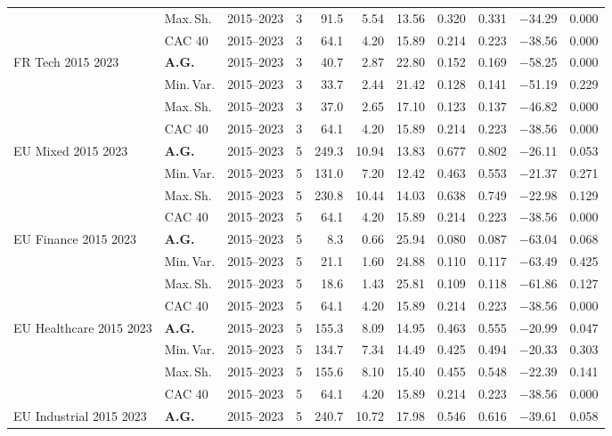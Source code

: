 \begin{longtable}{p{2.6cm} l c c r r r r r r r}
 & Max.\,Sh. & 2015--2023 & 3 & 91.5 & 5.54 & 13.56 & 0.320 & 0.331 & $-$34.29 & 0.000 \\
 & CAC 40 & 2015--2023 & 3 & 64.1 & 4.20 & 15.89 & 0.214 & 0.223 & $-$38.56 & 0.000 \\
\midrule
FR Tech 2015 2023 & \textbf{A.G.} & 2015--2023 & 3 & 40.7 & 2.87 & 22.80 & 0.152 & 0.169 & $-$58.25 & 0.000 \\
 & Min.\,Var. & 2015--2023 & 3 & 33.7 & 2.44 & 21.42 & 0.128 & 0.141 & $-$51.19 & 0.229 \\
 & Max.\,Sh. & 2015--2023 & 3 & 37.0 & 2.65 & 17.10 & 0.123 & 0.137 & $-$46.82 & 0.000 \\
 & CAC 40 & 2015--2023 & 3 & 64.1 & 4.20 & 15.89 & 0.214 & 0.223 & $-$38.56 & 0.000 \\
\midrule
EU Mixed 2015 2023 & \textbf{A.G.} & 2015--2023 & 5 & 249.3 & 10.94 & 13.83 & 0.677 & 0.802 & $-$26.11 & 0.053 \\
 & Min.\,Var. & 2015--2023 & 5 & 131.0 & 7.20 & 12.42 & 0.463 & 0.553 & $-$21.37 & 0.271 \\
 & Max.\,Sh. & 2015--2023 & 5 & 230.8 & 10.44 & 14.03 & 0.638 & 0.749 & $-$22.98 & 0.129 \\
 & CAC 40 & 2015--2023 & 5 & 64.1 & 4.20 & 15.89 & 0.214 & 0.223 & $-$38.56 & 0.000 \\
\midrule
EU Finance 2015 2023 & \textbf{A.G.} & 2015--2023 & 5 & 8.3 & 0.66 & 25.94 & 0.080 & 0.087 & $-$63.04 & 0.068 \\
 & Min.\,Var. & 2015--2023 & 5 & 21.1 & 1.60 & 24.88 & 0.110 & 0.117 & $-$63.49 & 0.425 \\
 & Max.\,Sh. & 2015--2023 & 5 & 18.6 & 1.43 & 25.81 & 0.109 & 0.118 & $-$61.86 & 0.127 \\
 & CAC 40 & 2015--2023 & 5 & 64.1 & 4.20 & 15.89 & 0.214 & 0.223 & $-$38.56 & 0.000 \\
\midrule
EU Healthcare 2015 2023 & \textbf{A.G.} & 2015--2023 & 5 & 155.3 & 8.09 & 14.95 & 0.463 & 0.555 & $-$20.99 & 0.047 \\
 & Min.\,Var. & 2015--2023 & 5 & 134.7 & 7.34 & 14.49 & 0.425 & 0.494 & $-$20.33 & 0.303 \\
 & Max.\,Sh. & 2015--2023 & 5 & 155.6 & 8.10 & 15.40 & 0.455 & 0.548 & $-$22.39 & 0.141 \\
 & CAC 40 & 2015--2023 & 5 & 64.1 & 4.20 & 15.89 & 0.214 & 0.223 & $-$38.56 & 0.000 \\
\midrule
EU Industrial 2015 2023 & \textbf{A.G.} & 2015--2023 & 5 & 240.7 & 10.72 & 17.98 & 0.546 & 0.616 & $-$39.61 & 0.058 \\

\end{longtable}
